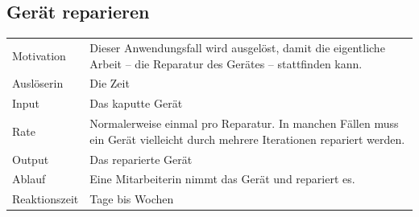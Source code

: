 \documentclass[a4paper]{scrartcl}
\begin{document}
\subsection{Gerät reparieren}
\begin{tabularx}{\textwidth}{l|X}
  Motivation & Dieser Anwendungsfall wird ausgelöst,
  damit die eigentliche Arbeit -- die Reparatur des Gerätes --
  stattfinden kann. \\
  Auslöserin & Die Zeit \\
  Input & Das kaputte Gerät \\
  Rate & Normalerweise einmal pro Reparatur. In manchen Fällen
  muss ein Gerät vielleicht durch mehrere Iterationen 
  repariert werden. \\
  Output & Das reparierte Gerät \\
  Ablauf & Eine Mitarbeiterin nimmt das Gerät und
  repariert es. \\
  Reaktionszeit & Tage bis Wochen \\
\end{tabularx}
\end{document}
